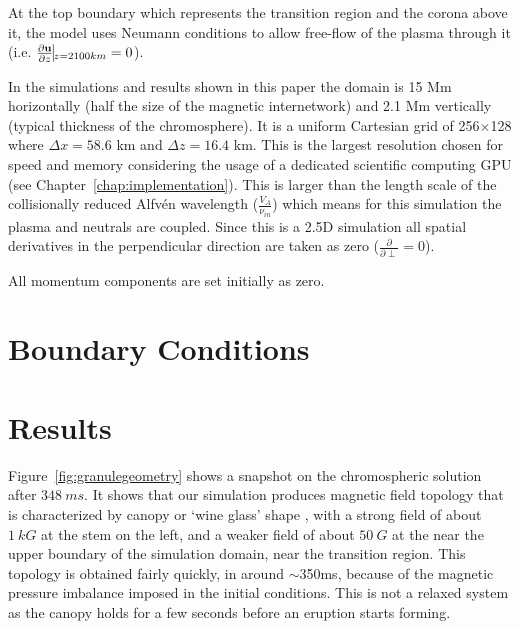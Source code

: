 \documentclass[12pt,upcase]{umlthesis}
\begin{document}
At the top boundary which represents the transition region and the corona above it, the model uses Neumann conditions to allow free-flow of the plasma through it (i.e. $\frac{\partial \textbf{u}}{\partial z}\vline_{z=2100km} = 0$).

In the simulations and results shown in this paper the domain is 15 Mm horizontally (half the size of the magnetic internetwork) and 2.1 Mm vertically (typical thickness of the chromosphere). It is a uniform Cartesian grid of 256$\times$128 where $\Delta x = 58.6$ km and $\Delta z = 16.4$ km. This is the largest resolution chosen for speed and memory considering the usage of a dedicated scientific computing GPU (see Chapter~\ref{chap:implementation}). This is larger than the length scale of the collisionally reduced Alfv\'en wavelength ($\frac{V_A}{\nu_{in}}$) which means for this simulation the plasma and neutrals are coupled. Since this is a 2.5D simulation all spatial derivatives in the perpendicular direction are taken as zero ($\frac{\partial}{\partial \perp} = 0$).

All momentum components are set initially as zero.

\section{Boundary Conditions}\label{sec:bc}

\section{Results}\label{sec:results}

Figure~\ref{fig:granulegeometry} shows a snapshot on the chromospheric solution after $348~ms$. It shows that our simulation produces magnetic field topology that is characterized by canopy or `wine glass' shape \citep{Rutten2007}, with a strong field of about $1~kG$ at the stem on the left, and a weaker field of about $50~G$ at the near the upper boundary of the simulation domain, near the transition region.  This topology is obtained fairly quickly, in around $\sim$350ms, because of the magnetic pressure imbalance imposed in the initial conditions. This is not a relaxed system as the canopy holds for a few seconds before an eruption starts forming. 
\end{document}
